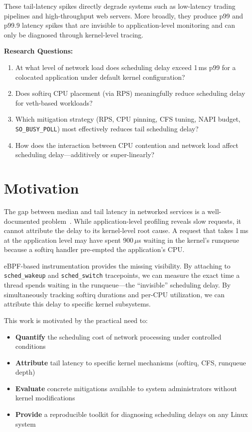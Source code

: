 \documentclass[11pt,a4paper]{article}
\begin{document}
These tail-latency spikes directly degrade systems such as low-latency trading pipelines and high-throughput web servers. More broadly, they produce p99 and p99.9 latency spikes that are invisible to application-level monitoring and can only be diagnosed through kernel-level tracing.

\textbf{Research Questions:}
\begin{enumerate}[leftmargin=*]
  \item At what level of network load does scheduling delay exceed 1\,ms p99 for a colocated application under default kernel configuration?
  \item Does softirq CPU placement (via RPS) meaningfully reduce scheduling delay for veth-based workloads?
  \item Which mitigation strategy (RPS, CPU pinning, CFS tuning, NAPI budget, \texttt{SO\_BUSY\_POLL}) most effectively reduces tail scheduling delay?
  \item How does the interaction between CPU contention and network load affect scheduling delay---additively or super-linearly?
\end{enumerate}


\section{Motivation}
\label{sec:motivation}

The gap between median and tail latency in networked services is a well-documented problem~\cite{dean2013tail, li2014tales}. While application-level profiling reveals slow requests, it cannot attribute the delay to its kernel-level root cause. A request that takes 1\,ms at the application level may have spent 900\,$\mu$s waiting in the kernel's runqueue because a softirq handler pre-empted the application's CPU.

eBPF-based instrumentation provides the missing visibility. By attaching to \texttt{sched\_wakeup} and \texttt{sched\_switch} tracepoints, we can measure the exact time a thread spends waiting in the runqueue---the ``invisible'' scheduling delay. By simultaneously tracking softirq durations and per-CPU utilization, we can attribute this delay to specific kernel subsystems.

This work is motivated by the practical need to:
\begin{itemize}[leftmargin=*]
  \item \textbf{Quantify} the scheduling cost of network processing under controlled conditions
  \item \textbf{Attribute} tail latency to specific kernel mechanisms (softirq, CFS, runqueue depth)
  \item \textbf{Evaluate} concrete mitigations available to system administrators without kernel modifications
  \item \textbf{Provide} a reproducible toolkit for diagnosing scheduling delays on any Linux system
\end{itemize}
\end{document}
